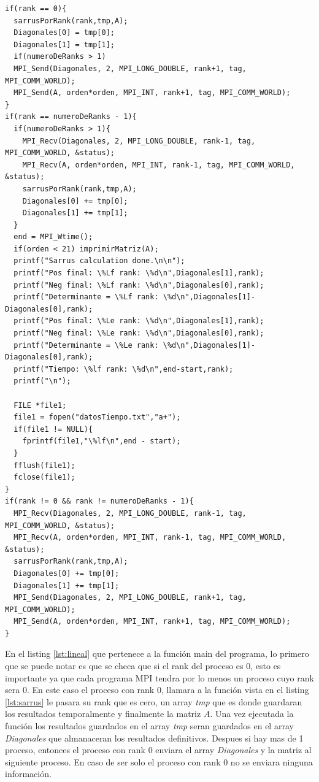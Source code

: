 \documentclass[10pt]{IEEEtran}
\begin{document}
\begin{lstlisting}[caption={Implementacion de Comunicación Lineal},label={lst:lineal}]
if(rank == 0){
  sarrusPorRank(rank,tmp,A);
  Diagonales[0] = tmp[0];
  Diagonales[1] = tmp[1];
  if(numeroDeRanks > 1)
  MPI_Send(Diagonales, 2, MPI_LONG_DOUBLE, rank+1, tag, MPI_COMM_WORLD);
  MPI_Send(A, orden*orden, MPI_INT, rank+1, tag, MPI_COMM_WORLD);
}
if(rank == numeroDeRanks - 1){
  if(numeroDeRanks > 1){
    MPI_Recv(Diagonales, 2, MPI_LONG_DOUBLE, rank-1, tag, MPI_COMM_WORLD, &status);
    MPI_Recv(A, orden*orden, MPI_INT, rank-1, tag, MPI_COMM_WORLD, &status);
    sarrusPorRank(rank,tmp,A);
    Diagonales[0] += tmp[0];
    Diagonales[1] += tmp[1];
  }
  end = MPI_Wtime();
  if(orden < 21) imprimirMatriz(A);
  printf("Sarrus calculation done.\n\n");
  printf("Pos final: \%Lf rank: \%d\n",Diagonales[1],rank);
  printf("Neg final: \%Lf rank: \%d\n",Diagonales[0],rank);
  printf("Determinante = \%Lf rank: \%d\n",Diagonales[1]-Diagonales[0],rank);
  printf("Pos final: \%Le rank: \%d\n",Diagonales[1],rank);
  printf("Neg final: \%Le rank: \%d\n",Diagonales[0],rank);
  printf("Determinante = \%Le rank: \%d\n",Diagonales[1]-Diagonales[0],rank);
  printf("Tiempo: \%lf rank: \%d\n",end-start,rank);
  printf("\n");

  FILE *file1;
  file1 = fopen("datosTiempo.txt","a+");
  if(file1 != NULL){
    fprintf(file1,"\%lf\n",end - start);
  }
  fflush(file1);
  fclose(file1);
}
if(rank != 0 && rank != numeroDeRanks - 1){
  MPI_Recv(Diagonales, 2, MPI_LONG_DOUBLE, rank-1, tag, MPI_COMM_WORLD, &status);
  MPI_Recv(A, orden*orden, MPI_INT, rank-1, tag, MPI_COMM_WORLD, &status);
  sarrusPorRank(rank,tmp,A);
  Diagonales[0] += tmp[0];
  Diagonales[1] += tmp[1];
  MPI_Send(Diagonales, 2, MPI_LONG_DOUBLE, rank+1, tag, MPI_COMM_WORLD);
  MPI_Send(A, orden*orden, MPI_INT, rank+1, tag, MPI_COMM_WORLD);
}
\end{lstlisting}

En el listing \ref{lst:lineal} que pertenece a la función main del programa, lo primero que se puede notar es que se checa que si el rank del proceso es 0, esto es importante ya que cada programa MPI tendra por lo menos un proceso cuyo rank sera 0. En este caso el proceso con rank 0, llamara a la función vista en el listing \ref{lst:sarrus} le pasara su rank que es cero, un array \textit{tmp} que es donde guardaran los resultados temporalmente y finalmente la matriz $A$. Una vez ejecutada la función los resultados guardados en el array \textit{tmp} seran guardados en el array \textit{Diagonales} que almanaceran los resultados definitivos. Despues si hay mas de 1 proceso, entonces el proceso con rank 0 enviara el array \textit{Diagonales} y la matriz al siguiente proceso. En caso de ser solo el proceso con rank 0 no se enviara ninguna información.
\end{document}
